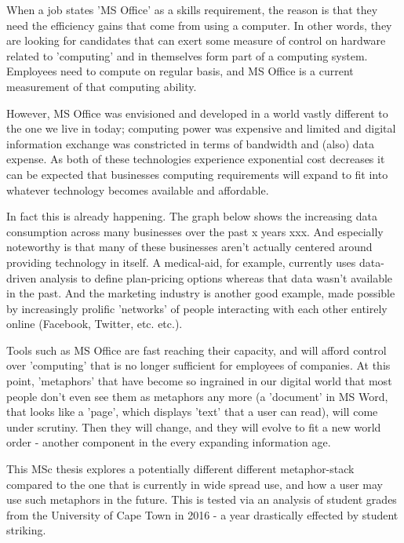 When a job states 'MS Office' as a skills requirement, the reason is that they need the efficiency gains that come from using a computer. In other words, they are looking for candidates that can exert some measure of control on hardware related to 'computing' and in themselves form part of a computing system. Employees need to compute on regular basis, and MS Office is a current measurement of that computing ability.

However, MS Office was envisioned and developed in a world vastly different to the one we live in today; computing power was expensive and limited and digital information exchange was constricted in terms of bandwidth and (also) data expense. As both of these technologies experience exponential cost decreases it can be expected that businesses computing requirements will expand to fit into whatever technology becomes available and affordable.

In fact this is already happening. The graph below shows the increasing data consumption across many businesses over the past x years xxx. And especially noteworthy is that many of these businesses aren't actually centered around providing technology in itself. A medical-aid, for example, currently uses data-driven analysis to define plan-pricing options whereas that data wasn't available in the past. And the marketing industry is another good example, made possible by increasingly prolific 'networks' of people interacting with each other entirely online (Facebook, Twitter, etc. etc.).

Tools such as MS Office are fast reaching their capacity, and will afford control over 'computing' that is no longer sufficient for employees of companies. At this point, 'metaphors' that have become so ingrained in our digital world that most people don't even see them as metaphors any more (a 'document' in MS Word, that looks like a 'page', which displays 'text' that a user can read), will come under scrutiny. Then they will change, and they will evolve to fit a new world order - another component in the every expanding information age.

This MSc thesis explores a potentially different different metaphor-stack compared to the one that is currently in wide spread use, and how a user may use such metaphors in the future. This is tested via an analysis of student grades from the University of Cape Town in 2016 - a year drastically effected by student striking.